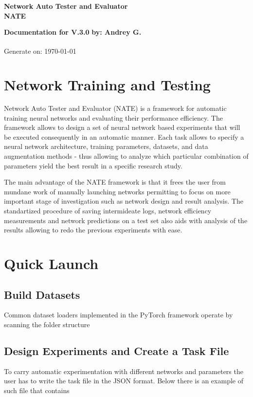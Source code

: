 \documentclass[a4paper, 11pt]{article}
\begin{document}
\begin{center}
\textbf{\Large{Network Auto Tester and Evaluator}}\\
\textbf{NATE}
\end{center}

\noindent
\large\textbf{Documentation for V.3.0} \hfill \textbf{by: Andrey G.} \\
\normalsize  \hfill \\
\hfill Generate on: \today 

\section{Network Training and Testing}
Network Auto Tester and Evaluator (NATE) is a framework for automatic training neural networks and evaluating their performance efficiency. The framework allows to design a set of neural network based experiments that will be executed consequently in an automatic manner. Each task allows to specify a neural network architecture, training parameters, datasets, and data augmentation methods - thus allowing to analyze which particular combination of parameters yield the best result in a specific research study. 

The main advantage of the NATE framework is that it frees the user from mundane work of manually launching networks permitting to focus on more important stage of investigation such as network design and result analysis. The standartized procedure of saving intermideate logs, network efficiency measurements and network predictions on a test set also aids with analysis of the results allowing to redo the previous experiments with ease.  

\section{Quick Launch}

\subsection{Build Datasets}
Common dataset loaders implemented in the PyTorch framework operate by scanning the folder structure 

\subsection{Design Experiments and Create a Task File}
To carry automatic experimentation with different networks and parameters the user has to write the task file in the JSON format. Below there is an example of such file that contains 
\end{document}
